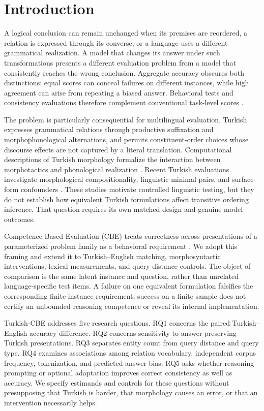 \section{Introduction}

A logical conclusion can remain unchanged when its premises are reordered, a relation is expressed through
its converse, or a language uses a different grammatical realization. A model that changes its answer under
such transformations presents a different evaluation problem from a model that consistently reaches the
wrong conclusion. Aggregate accuracy obscures both distinctions: equal scores can conceal failures on
different instances, while high agreement can arise from repeating a biased answer. Behavioral tests and
consistency evaluations therefore complement conventional task-level scores \citep{ribeiro2020checklist,
elazar2021pararel}.

The problem is particularly consequential for multilingual evaluation. Turkish expresses grammatical
relations through productive suffixation and morphophonological alternations, and permits constituent-order
choices whose discourse effects are not captured by a literal translation. Computational descriptions of
Turkish morphology formalize the interaction between morphotactics and phonological realization
\citep{oflazer1994turkish}. Recent Turkish evaluations investigate morphological compositionality,
linguistic minimal pairs, and surface-form confounders \citep{ismayilzada2025morphology,
basar2025turblimp, basar2026morphologyaware}. These studies motivate controlled linguistic testing, but
they do not establish how equivalent Turkish formulations affect transitive ordering inference. That
question requires its own matched design and genuine model outcomes.

Competence-Based Evaluation (CBE) treats correctness across presentations of a parameterized problem
family as a behavioral requirement \citep{jiang2026cbe}. We adopt this framing and extend it to
Turkish--English matching, morphosyntactic interventions, lexical measurements, and query-distance
controls. The object of comparison is the same latent instance and question, rather than unrelated
language-specific test items. A failure on one equivalent formulation falsifies the corresponding
finite-instance requirement; success on a finite sample does not certify an unbounded reasoning competence
or reveal its internal implementation.

Turkish-CBE addresses five research questions. RQ1 concerns the paired Turkish--English accuracy
difference. RQ2 concerns sensitivity to answer-preserving Turkish presentations. RQ3 separates entity
count from query distance and query type. RQ4 examines associations among relation vocabulary, independent
corpus frequency, tokenization, and predicted-answer bias. RQ5 asks whether reasoning prompting or
optional adaptation improves correct consistency as well as accuracy. We specify estimands and controls
for these questions without presupposing that Turkish is harder, that morphology causes an error, or that
an intervention necessarily helps.

